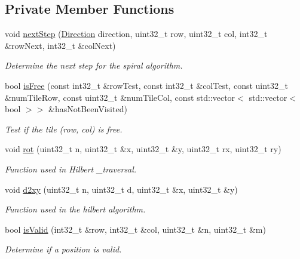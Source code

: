 \subsection*{Private Member Functions}
\begin{DoxyCompactItemize}
\item 
void \hyperlink{classfi_1_1Traversal_a82c1d4766a33867fb29b8d54581ff000}{next\+Step} (\hyperlink{namespacefi_ac2e0fa52c14712db1a6e70da35ae8352}{Direction} direction, uint32\+\_\+t row, uint32\+\_\+t col, int32\+\_\+t \&row\+Next, int32\+\_\+t \&col\+Next)
\begin{DoxyCompactList}\small\item\em Determine the next step for the spiral algorithm. \end{DoxyCompactList}\item 
bool \hyperlink{classfi_1_1Traversal_ac6002a1bd99614aefa265937a3fa989c}{is\+Free} (const int32\+\_\+t \&row\+Test, const int32\+\_\+t \&col\+Test, const uint32\+\_\+t \&num\+Tile\+Row, const uint32\+\_\+t \&num\+Tile\+Col, const std\+::vector$<$ std\+::vector$<$ bool $>$$>$ \&has\+Not\+Been\+Visited)
\begin{DoxyCompactList}\small\item\em Test if the tile (row, col) is free. \end{DoxyCompactList}\item 
void \hyperlink{classfi_1_1Traversal_a438a10f5688a0ba0d42c7dbf5b4bf305}{rot} (uint32\+\_\+t n, uint32\+\_\+t \&x, uint32\+\_\+t \&y, uint32\+\_\+t rx, uint32\+\_\+t ry)
\begin{DoxyCompactList}\small\item\em Function used in Hilbert \+\_\+traversal. \end{DoxyCompactList}\item 
void \hyperlink{classfi_1_1Traversal_a2f0459d7872d143e8b8d750ac14d4d7c}{d2xy} (uint32\+\_\+t n, uint32\+\_\+t d, uint32\+\_\+t \&x, uint32\+\_\+t \&y)
\begin{DoxyCompactList}\small\item\em Function used in the hilbert algorithm. \end{DoxyCompactList}\item 
bool \hyperlink{classfi_1_1Traversal_aab7fcc3167c9a749d951553251c8a89c}{is\+Valid} (int32\+\_\+t \&row, int32\+\_\+t \&col, uint32\+\_\+t \&n, uint32\+\_\+t \&m)
\begin{DoxyCompactList}\small\item\em Determine if a position is valid. \end{DoxyCompactList}\item 
$$
\end{DoxyCompactItemize}
